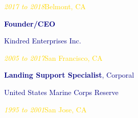 \documentclass[hidelinks, 10pt]{article}
\begin{document}
\begin{textblock}{4}
	\scriptsize\textcolor{gold}{\scriptsize\emph{2017 to 2018}\hfill Belmont, CA}

	\vspace{4mm}

	\footnotesize\textcolor{navy}{\scriptsize\textbf{Founder/CEO}}

	\vspace{0.5mm}

	\footnotesize\textcolor{navy}{\scriptsize Kindred Enterprises Inc.}

	\vspace{0.5mm}

	\scriptsize\textcolor{gold}{\scriptsize\emph{2005 to 2017}\hfill San
	Francisco, CA}

	\vspace{4mm}

	\footnotesize\textcolor{navy}{\scriptsize\textbf{Landing Support
	Specialist}, Corporal}

	\vspace{0.5mm}

	\footnotesize\textcolor{navy}{\scriptsize United States Marine Corps Reserve}

	\vspace{0.5mm}

	\scriptsize\textcolor{gold}{\scriptsize\emph{1995 to 2001}\hfill San Jose, CA}

	\vspace{3mm}
\end{textblock}
\end{document}
